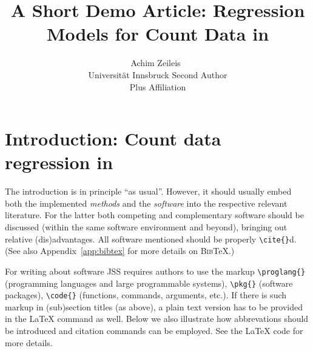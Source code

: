 \documentclass[article]{jss}
\author{Achim Zeileis~\orcidlink{0000-0003-0918-3766}\\Universit\"at Innsbruck
   \And Second Author\\Plus Affiliation}
\title{A Short Demo Article: Regression Models for Count Data in \proglang{R}}
\begin{document}


\section[Introduction: Count data regression in R]{Introduction: Count data regression in } \label{sec:intro}

\begin{leftbar}
  The introduction is in principle ``as usual''. However, it should usually embed
  both the implemented \emph{methods} and the \emph{software} into the respective
  relevant literature. For the latter both competing and complementary software
  should be discussed (within the same software environment and beyond), bringing
  out relative (dis)advantages. All software mentioned should be properly
  \verb|\cite{}|d. (See also Appendix~\ref{app:bibtex} for more details on
  \textsc{Bib}{\TeX}.)

  For writing about software JSS requires authors to use the markup
  \verb|\proglang{}| (programming languages and large programmable systems),
  \verb|\pkg{}| (software packages), \verb|\code{}| (functions, commands,
  arguments, etc.). If there is such markup in (sub)section titles (as above), a
  plain text version has to be provided in the {\LaTeX} command as well. Below we
  also illustrate how abbrevations should be introduced and citation commands can
  be employed. See the {\LaTeX} code for more details.
\end{leftbar}
\end{document}
